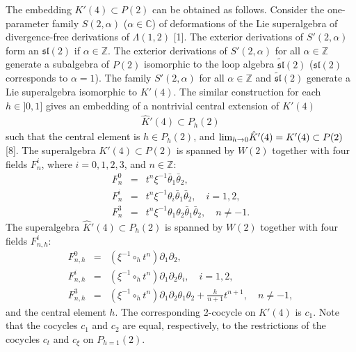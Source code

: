 \documentclass[a4paper,a4paper]{article}
\begin{document}
The embedding $K'(4)\subset P(2)$
can be obtained as follows. Consider the one-parameter
family  $S(2, \alpha)$ ($\alpha\in\mathbb C$) of deformations of
the  Lie superalgebra of divergence-free 
derivations of $\Lambda (1, 2)$ [1].
The exterior derivations of 
$S'(2, \alpha)$ form an $\mathfrak s\mathfrak l(2)$ if $\alpha\in\mathbb Z$.
The exterior derivations of $S'(2, \alpha)$  for all
$\alpha\in\mathbb Z$ generate a subalgebra of $P(2)$
isomorphic to the loop algebra
$\tilde {\mathfrak  s\mathfrak  l}(2)$ 
($\mathfrak s\mathfrak l(2)$ corresponds to $\alpha = 1$).
The family
$S'(2, \alpha)$ for all $\alpha \in \mathbb Z$
and $\tilde{\mathfrak s\mathfrak l}(2)$ generate a Lie superalgebra 
isomorphic to $K'(4)$.
The similar construction for each $h\in \rbrack 0, 1]$ gives
an embedding of a nontrivial central extension of $K'(4)$
\begin{eqnarray}
\hat{K}'(4) \subset P_h(2)
\end{eqnarray}
such that the central element is $h\in P_h(2)$, and
$\hbox{lim}_{h\rightarrow 0}\hat{K}'(4) =  K'(4)\subset P(2)$ [8].
The superalgebra $K'(4)\subset P(2)$ is spanned 
by $W(2)$ together with four fields $F^i_n$, where
$i = 0, 1, 2, 3$, and $n \in \mathbb Z$:
\begin{eqnarray}
F^0_n &=& t^n\xi^{-1}\bar{\theta}_1\bar{\theta}_2,\nonumber\\
F^i_n &=&t^n\xi^{-1}{\theta}_i\bar{\theta}_1\bar{\theta}_2, \quad i = 1, 2,\\
F^3_n &=& t^n\xi^{-1}{\theta}_1{\theta}_2
\bar{\theta}_1\bar{\theta}_2,\quad n\not= -1.\nonumber
\end{eqnarray}
The superalgebra $\hat{K}'(4)\subset P_h(2)$ is spanned 
by $W(2)$ together with four fields $F^i_{n,h}$:
\begin{eqnarray}
F^0_{n,h} &=& (\xi^{-1}\circ_h t^n)\partial_1\partial_2,\nonumber\\
F^i_{n,h} &=& (\xi^{-1}\circ_h t^n)\partial_1\partial_2{\theta}_i,\quad i = 1, 2,\\
F^3_{n,h} &=& (\xi^{-1}\circ_h t^n)\partial_1\partial_2{\theta}_1{\theta}_2
+ \frac {h} {n+1}t^{n+1}, \quad n\not= -1,\nonumber
\end{eqnarray}
and the central element $h$.
The corresponding 2-cocycle on $K'(4)$ is $c_1$. Note that
the cocycles $c_1$ and $c_2$ are equal, respectively,
to the restrictions of the cocycles $c_t$ and $c_{\xi}$ on $P_{h=1}(2)$.
\end{document}

